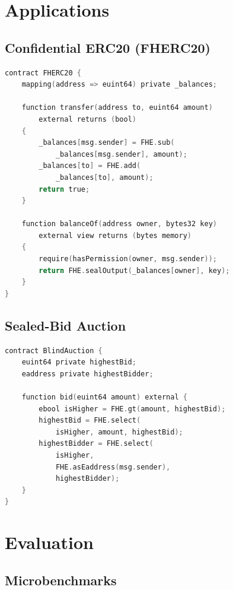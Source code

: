 \documentclass{../shared/luxfhe}
\begin{document}
\section{Applications}

\subsection{Confidential ERC20 (FHERC20)}

\begin{lstlisting}[language=C,caption=FHERC20 Token Contract]
contract FHERC20 {
    mapping(address => euint64) private _balances;
    
    function transfer(address to, euint64 amount) 
        external returns (bool) 
    {
        _balances[msg.sender] = FHE.sub(
            _balances[msg.sender], amount);
        _balances[to] = FHE.add(
            _balances[to], amount);
        return true;
    }
    
    function balanceOf(address owner, bytes32 key) 
        external view returns (bytes memory) 
    {
        require(hasPermission(owner, msg.sender));
        return FHE.sealOutput(_balances[owner], key);
    }
}
\end{lstlisting}

\subsection{Sealed-Bid Auction}

\begin{lstlisting}[language=C,caption=Encrypted Auction]
contract BlindAuction {
    euint64 private highestBid;
    eaddress private highestBidder;
    
    function bid(euint64 amount) external {
        ebool isHigher = FHE.gt(amount, highestBid);
        highestBid = FHE.select(
            isHigher, amount, highestBid);
        highestBidder = FHE.select(
            isHigher, 
            FHE.asEaddress(msg.sender), 
            highestBidder);
    }
}
\end{lstlisting}

\section{Evaluation}

\subsection{Microbenchmarks}
\end{document}
